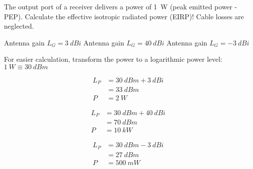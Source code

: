 \begin{question}[subtitle={Antenna Gain}]
	The output port of a receiver delivers a power of \SI{1}{W} (peak emitted power - PEP). Calculate the effective isotropic radiated power (EIRP)! Cable losses are neglected.
	
	\begin{tasks}
		\task
		Antenna gain $L_G = \SI{3}{dBi}$
		\task
		Antenna gain $L_G = \SI{40}{dBi}$
		\task
		Antenna gain $L_G = \SI{-3}{dBi}$
	\end{tasks}
\end{question}

\begin{solution}
	For easier calculation, transform the power to a logarithmic power level: $\SI{1}{W} \equiv \SI{30}{dBm}$
	
	\begin{tasks}
		\task
		\begin{equation*}
			\begin{split}
				L_P &= \SI{30}{dBm} + \SI{3}{dBi} \\
				 &= \SI{33}{dBm} \\
				P &= \SI{2}{W}
			\end{split}
		\end{equation*}
		
		\task
		\begin{equation*}
			\begin{split}
				L_P &= \SI{30}{dBm} + \SI{40}{dBi} \\
				&= \SI{70}{dBm} \\
				P &= \SI{10}{kW}
			\end{split}
		\end{equation*}
		
		
		\task
		\begin{equation*}
			\begin{split}
				L_P &= \SI{30}{dBm} - \SI{3}{dBi} \\
				&= \SI{27}{dBm} \\
				P &= \SI{500}{mW}
			\end{split}
		\end{equation*}
	\end{tasks}
\end{solution}

